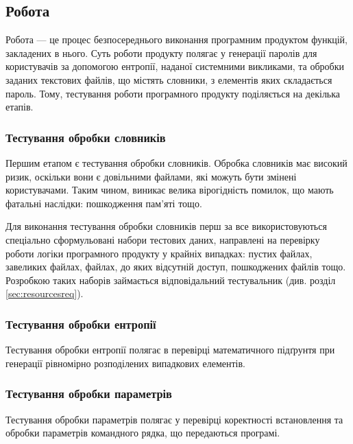 \documentclass[a4paper,oneside,DIV=12,12pt]{scrartcl}
\begin{document}
		\subsection{Робота}
			Робота --- це процес безпосереднього виконання програмним продуктом функцій, закладених в нього. Суть роботи продукту полягає у генерації паролів для користувачів за допомогою ентропії, наданої системними викликами, та обробки заданих текстових файлів, що містять словники, з елементів яких складається пароль. Тому, тестування роботи програмного продукту поділяється на декілька етапів.
			
			\subsubsection{Тестування обробки словників}
				Першим етапом є тестування обробки словників. Обробка словників має високий ризик, оскільки вони є довільними файлами, які можуть бути змінені користувачами. Таким чином, виникає велика вірогідність помилок, що мають фатальні наслідки: пошкодження пам'яті тощо.
				
				Для виконання тестування обробки словників перш за все використовуються спеціально сформульовані набори тестових даних, направлені на перевірку роботи логіки програмного продукту у крайніх випадках: пустих файлах, завеликих файлах, файлах, до яких відсутній доступ, пошкоджених файлів тощо. Розробкою таких наборів займається відповідальний тестувальник (див. розділ \ref{sec:resourcesreq}).
			\subsubsection{Тестування обробки ентропії}
				Тестування обробки ентропії полягає в перевірці математичного підґрунтя при генерації рівномірно розподілених випадкових елементів.
				
			\subsubsection{Тестування обробки параметрів}
				Тестування обробки параметрів полягає у перевірці коректності встановлення та обробки параметрів командного рядка, що передаються програмі.
		
\end{document}
